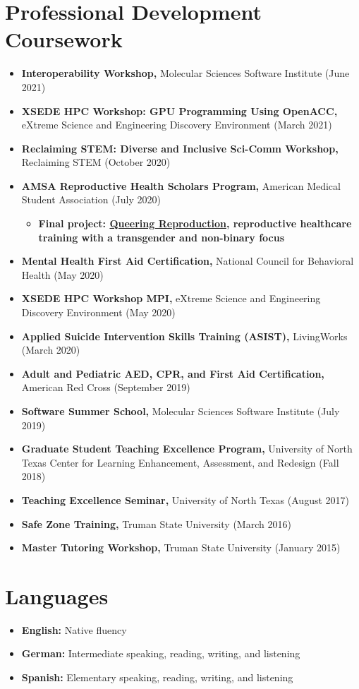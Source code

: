 \documentclass[letterpaper,11pt]{article}
\newcommand{\resumeItem}[2]{
  \item\small{
    \textbf{#1}{ #2 \vspace{-2pt}}
  }
}
\newcommand{\resumeSubItem}[2]{\resumeItem{#1}{#2}\vspace{-4pt}}
\newcommand{\resumeSubHeadingListStart}{\begin{itemize}[leftmargin=*]}
\newcommand{\resumeSubHeadingListEnd}{\end{itemize}}
\newcommand{\resumeItemListStart}{\begin{itemize}}
\newcommand{\resumeItemListEnd}{\end{itemize}\vspace{-5pt}}
\begin{document}
\section{Professional Development Coursework}
  \resumeSubHeadingListStart
    \resumeSubItem{Interoperability Workshop\textnormal{,}}
      {Molecular Sciences Software Institute (June 2021)} %
    \resumeSubItem{XSEDE HPC Workshop: GPU Programming Using OpenACC\textnormal{,}}
      {eXtreme Science and Engineering Discovery Environment (March 2021)} %
    \resumeSubItem{Reclaiming STEM: Diverse and Inclusive Sci-Comm Workshop\textnormal{,}}
      {Reclaiming STEM (October 2020)}
    \resumeSubItem{AMSA Reproductive Health Scholars Program\textnormal{,}}
      {American Medical Student Association (July 2020)}
      \resumeItemListStart
      \resumeItem{\textnormal{Final project: \href{https://queeringreproduction.com}{Queering Reproduction}, reproductive healthcare training with a transgender and non-binary focus}}
        {}
       \resumeItemListEnd
    \resumeSubItem{Mental Health First Aid Certification\textnormal{,}}
      {National Council for Behavioral Health (May 2020)}
    \resumeSubItem{XSEDE HPC Workshop MPI\textnormal{,}}
      {eXtreme Science and Engineering Discovery Environment (May 2020)}  
    \resumeSubItem{Applied Suicide Intervention Skills Training (ASIST)\textnormal{,}}
      {LivingWorks (March 2020)}
    \resumeSubItem{Adult and Pediatric AED, CPR, and First Aid Certification\textnormal{,}}
      {American Red Cross (September 2019)}
    \resumeSubItem{Software Summer School\textnormal{,}}
      {Molecular Sciences Software Institute (July 2019)}
    \resumeSubItem{Graduate Student Teaching Excellence Program\textnormal{,}}
      {University of North Texas Center for Learning Enhancement, Assessment, and Redesign (Fall 2018)}  
    \resumeSubItem{Teaching Excellence Seminar\textnormal{,}}
      {University of North Texas (August 2017)}
    \resumeSubItem{Safe Zone Training\textnormal{,}}
      {Truman State University (March 2016)}
    \resumeSubItem{Master Tutoring Workshop\textnormal{,}}
      {Truman State University (January 2015)}
  \resumeSubHeadingListEnd

\section{Languages}
  \resumeSubHeadingListStart
    \resumeSubItem{English:}
      {Native fluency}
      \resumeSubItem{German:}
      {Intermediate speaking, reading, writing, and listening}
      \resumeSubItem{Spanish:}
      {Elementary speaking, reading, writing, and listening}
\resumeSubHeadingListEnd
\end{document}
